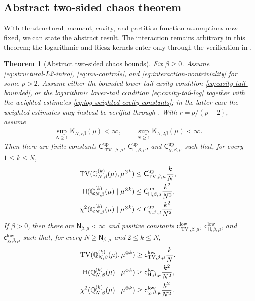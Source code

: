 \documentclass[11pt,reqno]{amsart}
\numberwithin{equation}{section}
\theoremstyle{plain}
\newtheorem{thm}{Theorem}[section]
\theoremstyle{remark}
\DeclarePairedDelimiter{\pa}{\lparen}{\rparen}
\newcommand{\Q}{{\mathbb{Q}}}
\newcommand{\K}{{\mathsf{K}}}
\newcommand{\Hr}{{\mathsf{H}}}
\newcommand{\be}{\beta}
\newcommand{\Chi}{\chi^2}
\newcommand{\TV}{\operatorname{TV}}
\begin{document}
\subsection{Abstract two-sided chaos theorem}
\label{subsec:abstract-two-sided-theorem}

With the structural, moment, cavity, and partition-function assumptions now fixed, we can state the abstract result.  The interaction remains arbitrary in this theorem; the logarithmic and Riesz kernels enter only through the verification in .

\begin{thm}[Abstract two-sided chaos bounds]\label{thm:chi2-chaos-two-sided}
Fix \(\be\ge0\).  Assume \eqref{eq:structural-L2-intro}, \eqref{eq:mu-controls}, and \eqref{eq:interaction-nontriviality} for some \(p>2\).  Assume either the bounded lower-tail cavity condition \eqref{eq:cavity-tail-bounded}, or the logarithmic lower-tail condition \eqref{eq:cavity-tail-log} together with the weighted estimates \eqref{eq:log-weighted-cavity-constants}; in the latter case the weighted estimates may instead be verified through .  With \(r=p/(p-2)\), assume
\begin{align}\label{eq:pf-input}
 \sup_{N\ge1}\K_{N,r\be}(\mu)<\infty,
 \qquad
 \sup_{N\ge1}\K_{N,2\be}(\mu)<\infty.
\end{align}
Then there are finite constants \(\mathsf C_{\TV,\be,\mu}^{\mathrm{up}}\), \(\mathsf C_{\Hr,\be,\mu}^{\mathrm{up}}\), and \(\mathsf C_{\chi,\be,\mu}^{\mathrm{up}}\) such that, for every \(1\le k\le N\),
\begin{align}\label{eq:unified-upper-final}
 \TV\pa{\Q_{N,\be}^{(k)}(\mu),\mu^{\otimes k}}
 &\le \mathsf C_{\TV,\be,\mu}^{\mathrm{up}}\frac{k}{N},\\
 \Hr\pa{\Q_{N,\be}^{(k)}(\mu)\mid\mu^{\otimes k}}
 &\le \mathsf C_{\Hr,\be,\mu}^{\mathrm{up}}\frac{k^2}{N^2},\\
 \Chi\pa{\Q_{N,\be}^{(k)}(\mu)\mid\mu^{\otimes k}}
 &\le \mathsf C_{\chi,\be,\mu}^{\mathrm{up}}\frac{k^2}{N^2}.
\end{align}
If \(\be>0\), then there are \(\mathsf N_{\be,\mu}<\infty\) and positive constants \(\mathsf c_{\TV,\be,\mu}^{\mathrm{low}}\), \(\mathsf c_{\Hr,\be,\mu}^{\mathrm{low}}\), and \(\mathsf c_{\chi,\be,\mu}^{\mathrm{low}}\) such that, for every \(N\ge\mathsf N_{\be,\mu}\) and \(2\le k\le N\),
\begin{align}\label{eq:unified-lower-final}
 \TV\pa{\Q_{N,\be}^{(k)}(\mu),\mu^{\otimes k}}
 &\ge \mathsf c_{\TV,\be,\mu}^{\mathrm{low}}\frac{k}{N},\\
 \Hr\pa{\Q_{N,\be}^{(k)}(\mu)\mid\mu^{\otimes k}}
 &\ge \mathsf c_{\Hr,\be,\mu}^{\mathrm{low}}\frac{k^2}{N^2},\\
 \Chi\pa{\Q_{N,\be}^{(k)}(\mu)\mid\mu^{\otimes k}}
 &\ge \mathsf c_{\chi,\be,\mu}^{\mathrm{low}}\frac{k^2}{N^2}.
 \label{eq:unified-lower-chi}
\end{align}
\end{thm}
\end{document}
